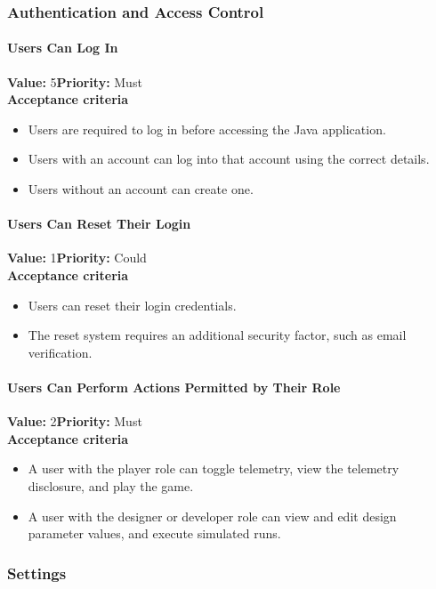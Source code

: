 \subsubsection{Authentication and Access Control}

\paragraph{Users Can Log In}
\textbf{Value:} 5\quad \textbf{Priority:} Must\\
\textbf{Acceptance criteria}
\begin{itemize}
  \item Users are required to log in before accessing the Java application.
  \item Users with an account can log into that account using the correct details.
  \item Users without an account can create one.
\end{itemize}

\paragraph{Users Can Reset Their Login}
\textbf{Value:} 1\quad \textbf{Priority:} Could\\
\textbf{Acceptance criteria}
\begin{itemize}
  \item Users can reset their login credentials.
  \item The reset system requires an additional security factor, such as email verification.
\end{itemize}

\paragraph{Users Can Perform Actions Permitted by Their Role}
\textbf{Value:} 2\quad \textbf{Priority:} Must\\
\textbf{Acceptance criteria}
\begin{itemize}
  \item A user with the player role can toggle telemetry, view the telemetry disclosure, and play the game.
  \item A user with the designer or developer role can view and edit design parameter values, and execute simulated runs.
\end{itemize}

\subsubsection{Settings}

